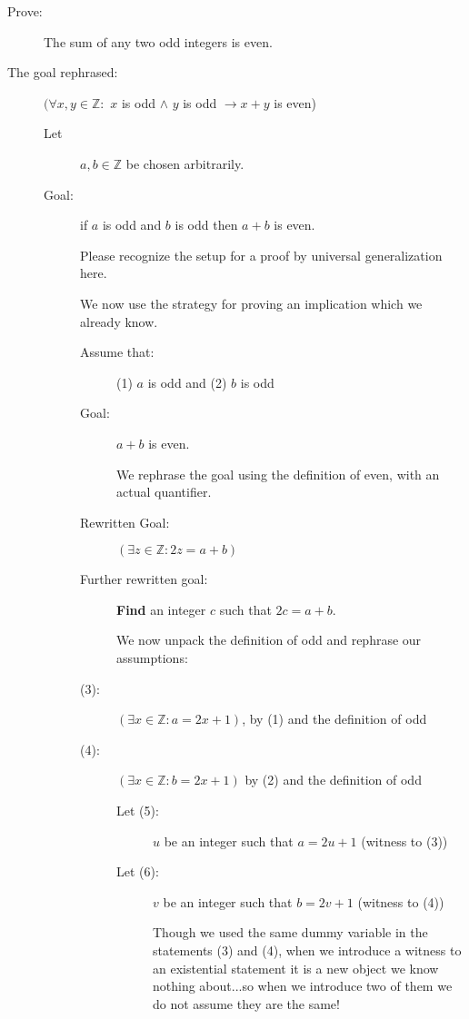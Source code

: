 \documentclass[12pt]{article}
\begin{document}
\newpage
\begin{description}
\item[Prove:]  The sum of any two odd integers is even.

\item[The goal rephrased:]  $(\forall x,y \in {\mathbb Z}:$ $x$ is odd $\wedge$ $ y$ is odd $\rightarrow x+y$ is even)

\begin{description}
\item[Let] $a,b \in {\mathbb Z}$ be chosen arbitrarily.

\item[Goal:]  if $a$ is odd and $b$ is odd then $a+b$ is even.

Please recognize the setup for a proof by universal generalization here.

We now use the strategy for proving an implication which we already know.

\begin{description}
\item[Assume that:]  (1) $a$ is odd and (2) $b$ is odd

\item[Goal:]  $a+b$ is even.

We rephrase the goal using the definition of even, with an actual quantifier.

\item[Rewritten Goal:]  $(\exists z \in {\mathbb Z}: 2z = a+b)$

\item[Further rewritten goal:]  {\bf Find} an integer $c$ such that $2c = a+b$.

We now unpack the definition of odd and rephrase our assumptions:

\item[(3):]  $(\exists x \in {\mathbb Z}:a=2x+1)$, by (1) and the definition of odd

\item[(4):]  $(\exists x \in {\mathbb Z}:b=2x+1)$ by (2) and the definition of odd

\begin{description}

\item[Let (5):]  $u$ be an integer such that $a=2u+1$ (witness to (3))

\item[Let (6):]  $v$ be an integer such that $b=2v+1$ (witness to (4))

Though we used the same dummy variable in the statements (3) and (4), when we introduce a witness to
an existential statement it is a new object we know nothing about...so when we introduce two of them we do not assume they are the same!


\end{description}
\end{description}
\end{description}
\end{description}
\end{document}
